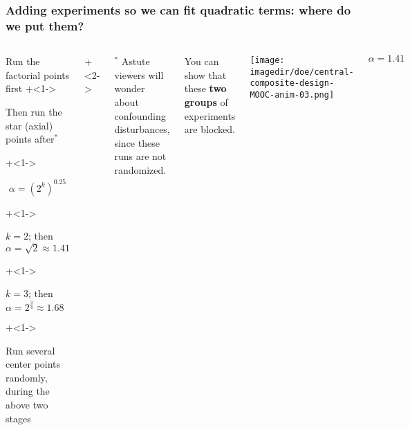 \documentclass[handout,11pt,aspectratio=169,mathserif]{beamer}
\begin{document}
\begin{frame}\frametitle{Adding experiments so we can fit quadratic terms: where do we put them?}
	\begin{columns}[T]
		
			\vspace{1cm}
			
			\begin{itemize}
				\item	Run the factorial points first
				\onslide+<1->{
					\item	Then run the star (axial) points after$^\ast$
				}
				\onslide+<1->{
					\Large
					\[\alpha  = \left(2^k\right)^{0.25}\]
					
			
					\begin{itemize}
						\onslide+<1->{\item	$k = 2$; then $\alpha = \sqrt{2} \approx 1.41$ }
						\onslide+<1->{\item	$k = 3$; then $\alpha = 2^{\tfrac{3}{4}} \approx 1.68$}
					\end{itemize}
					\normalsize
				}
				\onslide+<1->{
					\item	Run several center points randomly, during the above two stages
				}
			\end{itemize}
			
			\onslide+<2->{
				\vspace{0cm}
				\tiny
				$^\ast$ Astute viewers will wonder about confounding disturbances, since these runs are not randomized.
			
				You can show that these {\color[rgb]{0,0.5,1}\textbf{two}} {\color[rgb]{0.5,0, 0.5}\textbf{groups}} of experiments are blocked.
			}
			
			
			\centerline{\texttt{[image: \\imagedir/doe/central-composite-design-MOOC-anim-03.png]}}
			
			\vspace{-0.5cm}
			\[\alpha = 1.41\]
	\end{columns}
\end{frame}
\end{document}
